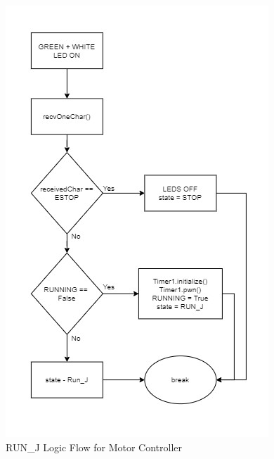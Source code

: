 \documentclass[journal]{IEEEtran}
\begin{document}
        \newpage
        \quad
        \newpage
        
        \begin{figure}[H]
            \centering
            \includegraphics[scale = 1.3]{Images/RUN_J_ver1.jpg}
            \caption{RUN\_J Logic Flow for Motor Controller}
            \label{fig:RUNJ_mc}
        \end{figure}
        
        \newpage
        \quad
        \newpage
        
\end{document}
